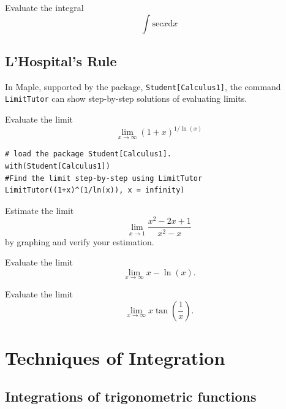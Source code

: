 \documentclass[en,11pt,simple]{elegantbook}
\let\BeginKnitrBlock\begin \let\EndKnitrBlock\end
\begin{document}
\BeginKnitrBlock{exercise}{}{}
\protect\hypertarget{exr:unnamed-chunk-194}{}{\label{exr:unnamed-chunk-194} }
Evaluate the integral
\[
\int \mathrm{sec} x \mathrm{d} x
\]
\EndKnitrBlock{exercise}

\hypertarget{lhospitals-rule}{%
\section{L'Hospital's Rule}\label{lhospitals-rule}}

In Maple, supported by the package, \texttt{Student{[}Calculus1{]}}, the command \texttt{LimitTutor} can show step-by-step solutions of evaluating limits.

\BeginKnitrBlock{example}{}{}
\protect\hypertarget{exm:unnamed-chunk-195}{}{\label{exm:unnamed-chunk-195} }
Evaluate the limit
\[
\lim\limits_{x\to \infty}(1+x)^{1/\ln(x)}
\]
\EndKnitrBlock{example}

\BeginKnitrBlock{solution}{}{}
{}

\begin{verbatim}
# load the package Student[Calculus1].
with(Student[Calculus1])
#Find the limit step-by-step using LimitTutor
LimitTutor((1+x)^(1/ln(x)), x = infinity)
\end{verbatim}
\EndKnitrBlock{solution}

\BeginKnitrBlock{exercise}{}{}
\protect\hypertarget{exr:unnamed-chunk-197}{}{\label{exr:unnamed-chunk-197} }
Estimate the limit
\[
\lim\limits_{x\to 1}\frac{x^2-2x+1}{x^2-x}
\]
by graphing and verify your estimation.
\EndKnitrBlock{exercise}

\BeginKnitrBlock{exercise}{}{}
\protect\hypertarget{exr:unnamed-chunk-198}{}{\label{exr:unnamed-chunk-198} }
Evaluate the limit
\[
\lim\limits_{x\to \infty} x-\ln(x).
\]
\EndKnitrBlock{exercise}

\BeginKnitrBlock{exercise}{}{}
\protect\hypertarget{exr:unnamed-chunk-199}{}{\label{exr:unnamed-chunk-199} }
Evaluate the limit
\[
\lim\limits_{x\to \infty} x\tan(\frac1x).
\]
\EndKnitrBlock{exercise}

\hypertarget{techniques-of-integration}{%
\chapter{Techniques of Integration}\label{techniques-of-integration}}

\hypertarget{integrations-of-trigonometric-functions}{%
\section{Integrations of trigonometric functions}\label{integrations-of-trigonometric-functions}}
\end{document}
